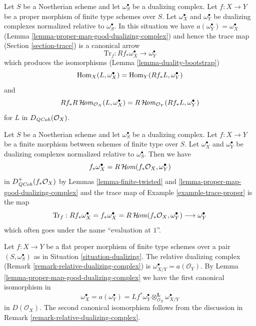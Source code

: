 \begin{example}
\label{example-trace-proper}
Let $S$ be a Noetherian scheme and let $\omega_S^\bullet$ be a
dualizing complex. Let $f : X \to Y$ be a proper morphism of finite
type schemes over $S$. Let $\omega_X^\bullet$ and $\omega_Y^\bullet$
be dualizing complexes normalized relative to $\omega_S^\bullet$.
In this situation we have $a(\omega_Y^\bullet) = \omega_X^\bullet$
(Lemma \ref{lemma-proper-map-good-dualizing-complex})
and hence the trace map (Section \ref{section-trace}) is a canonical arrow
$$
\text{Tr}_f : Rf_*\omega_X^\bullet \longrightarrow \omega_Y^\bullet
$$
which produces the isomorphisms (Lemma \ref{lemma-duality-bootstrap})
$$
\mathop{\mathrm{Hom}}\nolimits_X(L, \omega_X^\bullet) = \mathop{\mathrm{Hom}}\nolimits_Y(Rf_*L, \omega_Y^\bullet)
$$
and
$$
Rf_*R\mathop{\mathcal{H}\!\mathit{om}}\nolimits_{\mathcal{O}_X}(L, \omega_X^\bullet) =
R\mathop{\mathcal{H}\!\mathit{om}}\nolimits_{\mathcal{O}_Y}(Rf_*L, \omega_Y^\bullet)
$$
for $L$ in $D_{\mathit{QCoh}}(\mathcal{O}_X)$.
\end{example}

\begin{remark}
\label{remark-dualizing-finite}
Let $S$ be a Noetherian scheme and let $\omega_S^\bullet$ be a dualizing
complex. Let $f : X \to Y$ be a finite morphism between schemes of finite
type over $S$. Let $\omega_X^\bullet$ and $\omega_Y^\bullet$ be
dualizing complexes normalized relative to $\omega_S^\bullet$.
Then we have
$$
f_*\omega_X^\bullet = R\mathop{\mathcal{H}\!\mathit{om}}\nolimits(f_*\mathcal{O}_X, \omega_Y^\bullet)
$$
in $D_{\mathit{QCoh}}^+(f_*\mathcal{O}_X)$ by Lemmas \ref{lemma-finite-twisted} and
\ref{lemma-proper-map-good-dualizing-complex}
and the trace map of Example \ref{example-trace-proper} is the map
$$
\text{Tr}_f : Rf_*\omega_X^\bullet = f_*\omega_X^\bullet =
R\mathop{\mathcal{H}\!\mathit{om}}\nolimits(f_*\mathcal{O}_X, \omega_Y^\bullet) \longrightarrow
\omega_Y^\bullet
$$
which often goes under the name ``evaluation at $1$''.
\end{remark}

\begin{remark}
\label{remark-relative-dualizing-complex-shriek}
Let $f : X \to Y$ be a flat proper morphism of finite type
schemes over a pair $(S, \omega_S^\bullet)$ as in
Situation \ref{situation-dualizing}. The relative dualizing complex
(Remark \ref{remark-relative-dualizing-complex}) is
$\omega_{X/Y}^\bullet = a(\mathcal{O}_Y)$. By
Lemma \ref{lemma-proper-map-good-dualizing-complex}
we have the first canonical isomorphism in
$$
\omega_X^\bullet = a(\omega_Y^\bullet) =
Lf^*\omega_Y^\bullet \otimes_{\mathcal{O}_X}^\mathbf{L} \omega_{X/Y}^\bullet
$$
in $D(\mathcal{O}_X)$. The second canonical isomorphism follows from the
discussion in Remark \ref{remark-relative-dualizing-complex}.
\end{remark}




